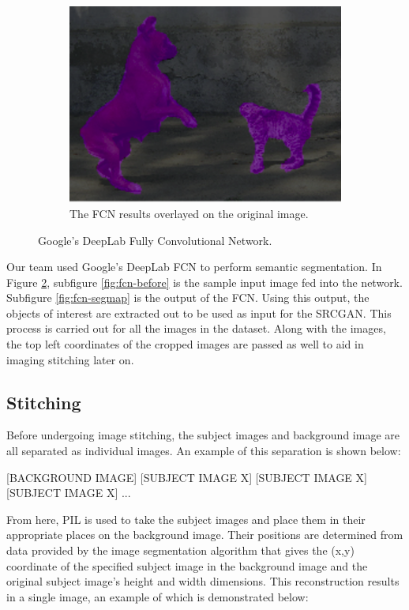 \begin{figure}
	\begin{subfigure}[h]{0.4\textwidth}
		\centering
		\includegraphics[width=\textwidth]{images/fcn-overlay.png}
		\caption{The FCN results overlayed on the original image.}
		\label{fig:fcn-overlay}
	\end{subfigure}

	\caption{Google's DeepLab Fully Convolutional Network.}
	\label{fig:fcn}
\end{figure}

Our team used Google’s DeepLab FCN to perform semantic segmentation.
In Figure \ref{fig:fcn}, subfigure \ref{fig:fcn-before} is the sample input image
fed into the network. Subfigure \ref{fig:fcn-segmap} is the output of the FCN. 
Using this output, the objects of
interest are extracted out to be used as input for the SRCGAN. This process is
carried out for all the images in the dataset. Along with the images, the top
left coordinates of the cropped images are passed as well to aid in imaging
stitching later on.

\subsection{Stitching}
Before undergoing image stitching, the subject images and background image are
all separated as individual images. An example of this separation is shown
below:

[BACKGROUND IMAGE]
[SUBJECT IMAGE X] [SUBJECT IMAGE X] [SUBJECT IMAGE X] ...

From here, PIL is used to take the subject images and place them in their
appropriate places on the background image. Their positions are determined from
data provided by the image segmentation algorithm that gives the (x,y)
coordinate of the specified subject image in the background image and the
original subject image’s height and width dimensions. This reconstruction
results in a single image, an example of which is demonstrated below:


